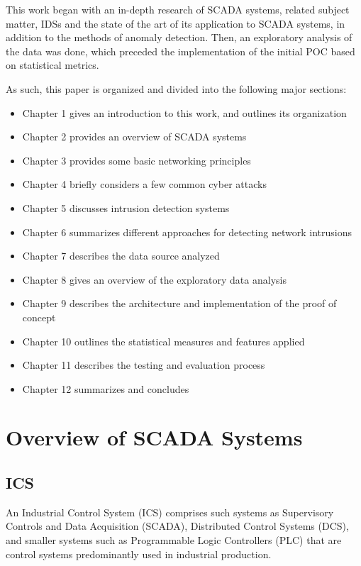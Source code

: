\documentclass[11pt,a4paper]{article}
\begin{document}
This work began with an in-depth research of SCADA systems, related
subject matter, IDSs and the state of the art of its application to
SCADA systems, in addition to the methods of anomaly detection. Then, an
exploratory analysis of the data was done, which preceded the
implementation of the initial POC based on statistical metrics.

As such, this paper is organized and divided into the following major
sections:

\begin{itemize}
\itemsep1pt\parskip0pt
\item
  Chapter 1 gives an introduction to this work, and outlines its
  organization
\item
  Chapter 2 provides an overview of SCADA systems
\item
  Chapter 3 provides some basic networking principles
\item
  Chapter 4 briefly considers a few common cyber attacks
\item
  Chapter 5 discusses intrusion detection systems
\item
  Chapter 6 summarizes different approaches for detecting network
  intrusions
\item
  Chapter 7 describes the data source analyzed
\item
  Chapter 8 gives an overview of the exploratory data analysis
\item
  Chapter 9 describes the architecture and implementation of the proof
  of concept
\item
  Chapter 10 outlines the statistical measures and features applied
\item
  Chapter 11 describes the testing and evaluation process
\item
  Chapter 12 summarizes and concludes
\end{itemize}

\clearpage

\section{Overview of SCADA Systems}\label{overview-of-scada-systems}

\subsection{ICS}\label{ics}

An Industrial Control System (ICS) comprises such systems as Supervisory
Controls and Data Acquisition (SCADA), Distributed Control Systems
(DCS), and smaller systems such as Programmable Logic Controllers (PLC)
that are control systems predominantly used in industrial production.
\end{document}
